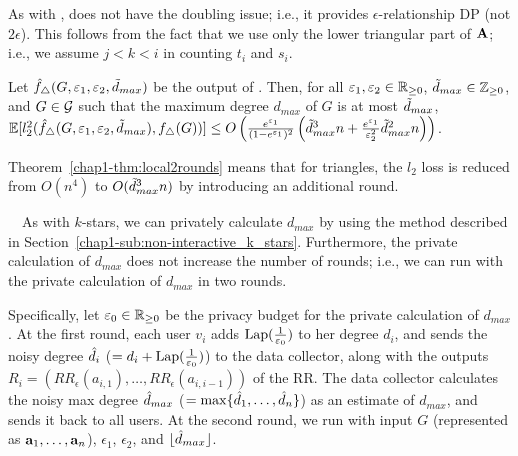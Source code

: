 As with ,  does not have the doubling issue; i.e., it provides $\epsilon$-relationship DP (not $2\epsilon$). 
This follows from the fact that we 
use only the lower triangular part of $\mathbf{A}$; 
i.e., we assume 
$j<k<i$ 
in counting $t_i$ and $s_i$. 

\begin{theorem}\label{chap1-thm:local2rounds}
  Let 
  $\hat{f}_{\triangle}(G, \varepsilon_1, \varepsilon_2, \tilde{d}_{max})$ 
  be the output of 
  . 
  Then, for all 
  $\varepsilon_1,\varepsilon_2 \in \mathbb{R}_{\ge0}$, 
  $\tilde{d}_{max} \in \mathbb{Z}_{\ge0}$,
  and $G\in \mathcal{G}$ such that the
  maximum degree $d_{max}$ of $G$ is 
  at most 
  $\tilde{d}_{max}$,
  $\mathbb{E}[l_2^2(\hat{f}_{\triangle}(G, \varepsilon_1, \varepsilon_2, \tilde{d}_{max}), f_\triangle(G))] 
  \leq
    O\left(\frac{e^{\varepsilon_1}}{(1-e^{\varepsilon_1})^2} \left(\tilde{d}_{max}^3 n +
    \frac{e^{\varepsilon_1}}{\varepsilon_2^2}\tilde{d}_{max}^2 n\right)\right)$.
\end{theorem}

Theorem~\ref{chap1-thm:local2rounds} means that for triangles, the $l_2$ loss 
is reduced from $O(n^4)$ to $O(\tilde{d}_{max}^3n)$ by introducing an additional round. 


\smallskip
{}~~As with $k$-stars, we can privately calculate $d_{max}$ 
by using the method described in Section~\ref{chap1-sub:non-interactive_k_stars}. 
Furthermore, the private calculation of $d_{max}$ does not increase the number of rounds; i.e., we can run  with the private calculation of $d_{max}$ in two rounds. 

Specifically, let $\varepsilon_0 \in \mathbb{R}_{\ge0}$ be the privacy budget for the private calculation of $d_{max}$. 
At the first round, each user $v_i$ adds $\textrm{Lap}(\frac{1}{\varepsilon_0})$ to her degree $d_i$, 
and sends the noisy degree $\hat{d}_i$ ($=d_i + \textrm{Lap}(\frac{1}{\varepsilon_0})$) to the data collector, along with the outputs $R_i = (RR_\epsilon(a_{i,1}), \ldots, RR_\epsilon(a_{i,i-1}))$ of the RR. 
The data collector calculates the noisy max degree $\hat{d}_{max}$ ($= \max\{\hat{d}_1,
\ldots, \hat{d}_n\}$) as an estimate of $d_{max}$, and sends it back to all users. 
At the second round, we run  with input $G$ (represented as $\mathbf{a}_1, \ldots, \mathbf{a}_n$), $\epsilon_1$, $\epsilon_2$, and $\lfloor \hat{d}_{max} \rfloor$. 

